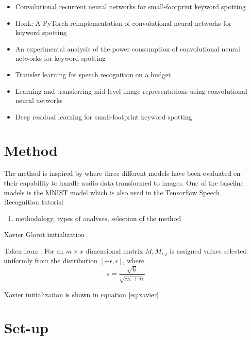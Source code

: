 \documentclass{article}
\theoremstyle{definition}
\theoremstyle{remark}
\begin{document}
\begin{itemize}
	\item Convolutional recurrent neural networks for small-footprint keyword spotting \cite{arik2017convolutional}
	\item Honk: A PyTorch reimplementation of convolutional neural networks for keyword spotting \cite{tang2017honk}
	\item An experimental analysis of the power consumption of convolutional neural networks for keyword spotting \cite{tang2018experimental}
	\item Transfer learning for speech recognition on a budget \cite{kunze2017transfer}
	\item Learning and transferring mid-level image representations using convolutional neural networks \cite{oquab2014learning}
	\item Deep residual learning for small-footprint keyword spotting \cite{tang2018deep}
\end{itemize}




\section{Method}

The method is inspired by \cite{gouda2018speech} where three different models have been evaluated on their capability to handle audio data transformed to images. One of the baseline models is the MNIST model which is also used in the Tensorflow Speech Recognition tutorial \cite{tutorial}


\begin{enumerate}
	\item methodology, types of analyses, selection of the method
\end{enumerate}


Xavier Glorot initialization \cite{glorot2010understanding}

Taken from \cite{gouda2018speech}: For an $m \times x$ dimensional matrix $M, M_{i,j}$ is assigned values selected uniformly from the distribution $[-\epsilon, \epsilon]$, where
\begin{equation} \label{eq:xavier}
\epsilon = \frac{\sqrt{6}}{\sqrt{m + n}}
\end{equation}


Xavier initialization is shown in equation \ref{eq:xavier}



\section{Set-up} \label{setup}
\end{document}
